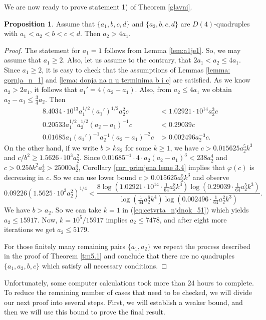 \documentclass[12pt]{amsart}%
\theoremstyle{definition}
\newtheorem{proposition}[theorem]{Proposition}
\theoremstyle{remark}
\theoremstyle{plain}
\begin{document}
We are now ready to prove statement 1) of Theorem \ref{glavni}.
\begin{proposition} 
\label{prop: prop1}
    Assume that $\{a_1,b,c,d\}$ and $\{a_2,b,c,d\}$ are $D(4)$-quadruples with $a_1<a_2<b<c<d$. Then $a_2>4a_1$.
\end{proposition}
\begin{proof}
The statement for $a_1=1$ follows from Lemma \ref{lem:a1je1}. So, we may assume that $a_1\geq 2$. Also, let us assume to the contrary, that $2a_1 < a_2 \leq 4a_1$. Since $a_1\geq 2$, it is easy to check that the assumptions of Lemmas \ref{lemma: gornja_n_1} and \ref{lema: donja na n u terminima b i c} are satisfied. As we know $a_2 > 2a_1$, it follows that $a_1'=4(a_2-a_1)$. Also, from $a_2 \leq 4a_1$ we obtain $a_2-a_1 \leq \frac{3}{4}a_2$. Then
    \begin{align*}
 8.4034\cdot 10^{13}a_1^{1/2}(a_1')^{1/2}a_2^2c&<1.02921\cdot 10^{14}a_2^3c\\
 0.20533a_1^{1/2}a_2^{1/2}(a_2-a_1)^{-1}c&<0.29039c\\
 0.01685a_1(a_1')^{-1}a_2^{-1}(a_2-a_1)^{-2}c&>0.002496a_2^{-3}c.
\end{align*}
On the other hand, if we write $b>ka_2$ for some $k \geq 1$, we have $c > 0.015625a_2^5k^3$ and $c/b^2 \geq 1.5626 \cdot 10^3 a_2^2$. Since $0.01685^{-1}\cdot 4\cdot a_2(a_2-a_1)^3<238a_2^4$ and $c>0.25bk^2a_2^4>25000a_2^4$, Corollary \ref{cor: primjena leme 3.4} implies that $\varphi(c)$ is decreasing in $c$. So we can use lower bound $c > 0.015625a_2^5k^3$ and observe 
\begin{equation}\label{eq:cetvrta_njdnok_51}
    0.09226(1.5625\cdot 10^3a_2^2)^{1/4}<\frac{8\log(1.02921\cdot 10^{14}\cdot\frac{1}{64}a_2^8k^3)\log(0.29039\cdot\frac{1}{64}a_2^5k^3)}{\log(\frac{1}{64}a_2^6k^4)\log(0.002496 \cdot \frac{1}{64} a_2^2k^3)}.
\end{equation}
We have $b > a_2$. So we can take $k = 1$ in (\ref{eq:cetvrta_njdnok_51}) which yields $a_2\leq 15917$. Now, $k=10^5/15917$ implies $a_2 \leq 7478$, and after eight more iterations we get $a_2 \leq 5179$.

For those finitely many remaining pairs $\{a_1,a_2\}$ we repeat the process described in the proof of Theorem \ref{tm5.1} and conclude that there are no quadruples $\{a_1,a_2,b,c\}$ which satisfy all necessary conditions.
\end{proof}
Unfortunately, some computer calculations took more than 24 hours to complete. To reduce the remaining number of cases that need to be checked, we will divide our next proof into several steps. First, we will establish a weaker bound, and then we will use this bound to prove the final result.
\end{document}
